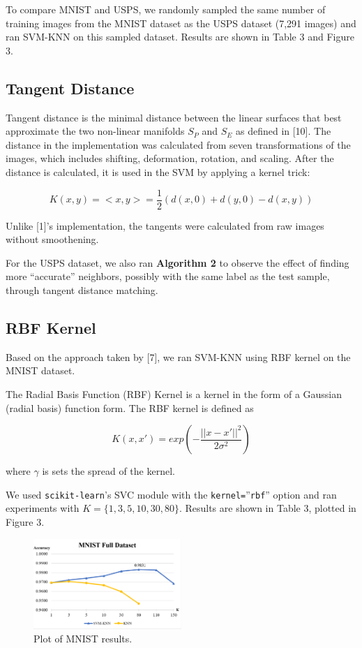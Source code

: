 \documentclass[11pt,letterpaper]{article}
\begin{document}
To compare MNIST and USPS, we randomly sampled the same number of training images from the MNIST dataset as the USPS dataset (7,291 images) and ran SVM-KNN on this sampled dataset. Results are shown in Table 3 and Figure 3.

\subsection{Tangent Distance}

Tangent distance is the minimal distance between the linear surfaces that best approximate the two non-linear manifolds $S_P$ and $S_E$ as defined in [10]. The distance in the implementation was calculated from seven transformations of the images, which includes shifting, deformation, rotation, and scaling. After the distance is calculated, it is used in the SVM by applying a kernel trick:

$$K(x,y)=<x,y>=\frac{1}{2}(d(x,0)+d(y,0)-d(x,y))$$

Unlike [1]'s implementation, the tangents were calculated from raw images without smoothening.


For the USPS dataset, we also ran \textbf{Algorithm 2} to observe the effect of finding more ``accurate'' neighbors, possibly with the same label as the test sample, through tangent distance matching.

\subsection{RBF Kernel}

Based on the approach taken by [7], we ran SVM-KNN using RBF kernel on the MNIST dataset.

The Radial Basis Function (RBF) Kernel is a kernel in the form of a Gaussian (radial basis) function form. The RBF kernel is defined as 

$$K(x, x') = exp\left(-\frac{||x-x'||^2}{2\sigma^2}\right)$$

where $\gamma$ is sets the spread of the kernel.

We used {\tt scikit-learn}'s SVC module with the {\tt kernel=}''{\tt rbf}'' option and ran experiments with $K=\{1,3,5,10,30,80\}$. Results are shown in Table 3, plotted in Figure 3.

\begin{figure}[t!]
  \centering
  \includegraphics[keepaspectratio, width=0.5\textwidth]{mnist_full.png}
  \caption{Plot of MNIST results.}
\end{figure}
\end{document}
